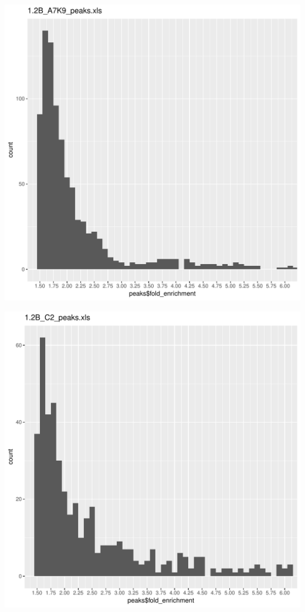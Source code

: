 \documentclass{article}\usepackage[]{graphicx}\usepackage[]{color}
\makeatletter
\def\maxwidth{ %
  \ifdim\Gin@nat@width>\linewidth
    \linewidth
  \else
    \Gin@nat@width
  \fi
}
\newenvironment{knitrout}{}{} %
\makeatother
\begin{document}
\begin{knitrout}
\includegraphics[width=\maxwidth]{figure/unnamed-chunk-2-6} 

\includegraphics[width=\maxwidth]{figure/unnamed-chunk-2-7} 


\end{knitrout}
\end{document}
